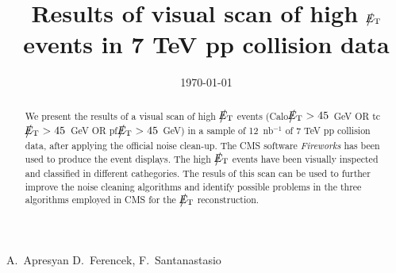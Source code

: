 \documentclass{cmspaper}
\def\etmiss{\big\slash\hspace{-1.6ex}{E_\text{T}}}
\begin{document}
\begin{linenumbers}


\begin{titlepage}


   \date{\today}

  \title{Results of visual scan of high $\etmiss$ events in 7 TeV pp collision data}

  \begin{Authlist}
    A.~Apresyan
    D.~Ferencek, F.~Santanastasio %
  \end{Authlist}



  \begin{abstract}    
   We present the results of a visual scan of high $\etmiss$ events 
   (Calo$\etmiss>45$~GeV OR tc$\etmiss>45$~GeV OR pf$\etmiss>45$~GeV)
   in a sample of 12~nb$^{-1}$ of 7 TeV pp collision data, 
   after applying the official noise clean-up. 
   The CMS software {\it Fireworks} has been used to produce the event displays. 
   The high $\etmiss$ events have been visually inspected and classified in different 
   cathegories. The resuls of this scan can be used to further improve the noise 
   cleaning algorithms and identify possible problems in the three algorithms employed 
   in CMS for the $\etmiss$ reconstruction.
  \end{abstract} 

  
\end{titlepage}

\setcounter{page}{2}%

\tableofcontents

\clearpage




\clearpage

%


\end{linenumbers}
\end{document}
